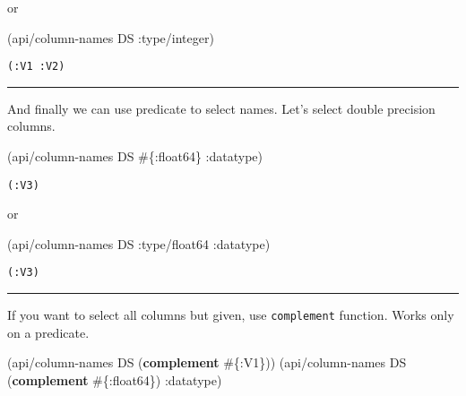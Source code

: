 \documentclass[]{article}
\newenvironment{Shaded}{\begin{snugshade}}{\end{snugshade}}
\newcommand{\KeywordTok}[1]{\textcolor[rgb]{0.13,0.29,0.53}{\textbf{#1}}}
\newcommand{\AttributeTok}[1]{\textcolor[rgb]{0.77,0.63,0.00}{#1}}
\newcommand{\NormalTok}[1]{#1}
\begin{document}
or

\begin{Shaded}
\begin{Highlighting}[]
\NormalTok{(api/column-names DS }\AttributeTok{:type/integer}\NormalTok{)}
\end{Highlighting}
\end{Shaded}

\begin{verbatim}
(:V1 :V2)
\end{verbatim}

\begin{center}\rule{0.5\linewidth}{0.5pt}\end{center}

And finally we can use predicate to select names. Let's select double
precision columns.

\begin{Shaded}
\begin{Highlighting}[]
\NormalTok{(api/column-names DS #\{}\AttributeTok{:float64}\NormalTok{\} }\AttributeTok{:datatype}\NormalTok{)}
\end{Highlighting}
\end{Shaded}

\begin{verbatim}
(:V3)
\end{verbatim}

or

\begin{Shaded}
\begin{Highlighting}[]
\NormalTok{(api/column-names DS }\AttributeTok{:type/float64} \AttributeTok{:datatype}\NormalTok{)}
\end{Highlighting}
\end{Shaded}

\begin{verbatim}
(:V3)
\end{verbatim}

\begin{center}\rule{0.5\linewidth}{0.5pt}\end{center}

If you want to select all columns but given, use \texttt{complement}
function. Works only on a predicate.

\begin{Shaded}
\begin{Highlighting}[]
\NormalTok{(api/column-names DS (}\KeywordTok{complement}\NormalTok{ #\{}\AttributeTok{:V1}\NormalTok{\}))}
\NormalTok{(api/column-names DS (}\KeywordTok{complement}\NormalTok{ #\{}\AttributeTok{:float64}\NormalTok{\}) }\AttributeTok{:datatype}\NormalTok{)}
\end{Highlighting}
\end{Shaded}
\end{document}
